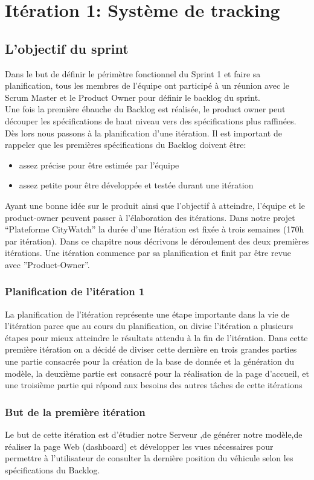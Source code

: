 \section{Itération 1: Système de tracking}

\subsection{L'objectif du sprint}
Dans le but de définir le périmètre fonctionnel du Sprint 1 et faire
sa planification, tous les membres de l'équipe ont participé à un réunion
avec le Scrum Master et le Product Owner pour définir le backlog du sprint.\\

Une fois la première ébauche du Backlog est réalisée, le product owner peut découper
les spécifications de haut niveau vers des spécifications plus raffinées. Dès lors nous
passons à la planification d’une itération. Il est important de rappeler que les premières
spécifications du Backlog doivent être:
\begin{itemize}
 \item assez précise pour être estimée par l’équipe
 \item assez petite pour être développée et testée durant une itération
\end{itemize}
Ayant une bonne idée sur le produit ainsi que l’objectif à atteindre, l’équipe et le
product-owner peuvent passer à l’élaboration des itérations.
Dans notre projet ``Plateforme CityWatch'' la durée d’une Itération est fixée à trois
semaines (170h par itération). Dans ce chapitre nous décrivons le déroulement des deux
premières itérations. Une itération commence par sa planification et finit par être revue
avec ”Product-Owner”.
\subsubsection{Planification de l'itération 1}
La planification de l'itération représente une étape importante dans la vie de
l'itération parce que au cours du planification, on divise l'itération a plusieurs étapes
pour mieux atteindre le résultats attendu à la fin de l'itération.
Dans cette première itération on a décidé de diviser cette dernière en trois grandes
parties une partie consacrée pour la création de la base de donnée et la génération du
modèle, la deuxième partie est consacré pour la réalisation de la page d’accueil, et une
troisième partie qui répond aux besoins des autres tâches de cette itérations
\subsubsection{But de la première itération}
Le but de cette itération est d'étudier notre Serveur ,de générer notre modèle,de réaliser
la page Web (dashboard) et développer les vues nécessaires pour permettre à l'utilisateur
de consulter la dernière position du véhicule selon les spécifications du Backlog.
